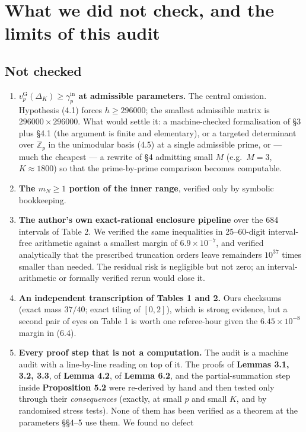 \documentclass[11pt]{article}
\theoremstyle{definition}
\newcommand{\vG}{v_p^{\mathrm{G}}}
\newcommand{\gin}{\gamma_p^{\mathrm{in}}}
\begin{document}
\section{What we did not check, and the limits of this audit}\label{sec:notchecked}

\subsection{Not checked}

\begin{enumerate}
\item \textbf{$\vG(\Delta_K)\ge\gin$ at admissible parameters.} The central omission. Hypothesis
(4.1) forces $h\ge296000$; the smallest admissible matrix is $296000\times296000$. What would
settle it: a machine-checked formalisation of \S3 plus \S4.1 (the argument is finite and
elementary), or a targeted determinant over $\mathbb{Z}_p$ in the unimodular basis (4.5) at a
single admissible prime, or --- much the cheapest --- a rewrite of \S4 admitting small $M$
(e.g.\ $M=3$, $K\approx1800$) so that the prime-by-prime comparison becomes computable.
\item \textbf{The $m_N\ge1$ portion of the inner range}, verified only by symbolic bookkeeping.
\item \textbf{The author's own exact-rational enclosure pipeline} over the 684 intervals of
Table 2. We verified the same inequalities in 25--60-digit interval-free arithmetic against a
smallest margin of $6.9\times10^{-7}$, and verified analytically that the prescribed truncation
orders leave remainders $10^{37}$ times smaller than needed. The residual risk is negligible but
not zero; an interval-arithmetic or formally verified rerun would close it.
\item \textbf{An independent transcription of Tables 1 and 2.} Ours checksums (exact mass
$37/40$; exact tiling of $[0,2]$), which is strong evidence, but a second pair of eyes on
Table 1 is worth one referee-hour given the $6.45\times10^{-8}$ margin in (6.4).
\item \textbf{Every proof step that is not a computation.} The audit is a machine audit with a
line-by-line reading on top of it. The proofs of \textbf{Lemmas 3.1, 3.2, 3.3}, of
\textbf{Lemma 4.2}, of \textbf{Lemma 6.2}, and the partial-summation step inside
\textbf{Proposition 5.2} were re-derived by hand and then tested only through their
\emph{consequences} (exactly, at small $p$ and small $K$, and by randomised stress tests). None
of them has been verified as a theorem at the parameters \S\S4--5 use them. We found no defect

\end{enumerate}
\end{document}

